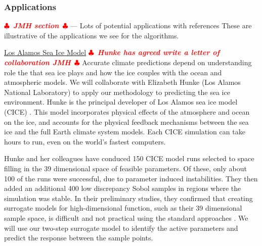 \documentclass[11pt]{NSFamsart}
\newif\ifnotesw \noteswtrue
\newcommand{\notes}[1]{\ifnotesw \textcolor{red}{  $\clubsuit$\ {\sf \bf \it  #1}\ $\clubsuit$  }\fi}
\begin{document}
\subsubsection{Applications} \notes{JMH section}
--- Lots of potential applications with references 
These are illustrative of the applications we see for the algorithms. 


\underline{Los Alamos Sea Ice Model}  \notes{Hunke has agreed write a letter of collaboration JMH}
Accurate climate predictions depend on understanding role the that sea ice plays and how the ice couples with the ocean and atmospheric models.
We will collaborate with Elizabeth Hunke (Los Alamos National Laboratory) to apply our methodology to predicting the sea ice environment.   Hunke is the principal developer of  Los Alamos sea ice model (CICE) \cite{hunke2017cice, hunke2010cice}. This model incorporates physical effects of the atmosphere and ocean on the ice, and accounts for the physical feedback mechanisms between the sea ice and the full Earth climate system models. Each CICE simulation can take hours to run, even on the world's fastest computers.

   
Hunke and her colleagues have conduced 150 CICE model runs selected to space filling in the 39 dimensional  space of feasible  parameters.   Of these, only about 100 of the runs were successful, due to parameter induced instabilities.  They then added an additional 400 low discrepancy Sobol samples in regions where the simulation was stable.  In their preliminary studies, they confirmed that creating surrogate models for high-dimensional function, such as their 39 dimensional sample space, is difficult and not practical using the standard approaches \cite{bengio2006curse, o2010oxford}.  We will use our two-step surrogate model to identify the active parameters \cite{constantine2014active} and predict the response between the sample points.  
\end{document}
